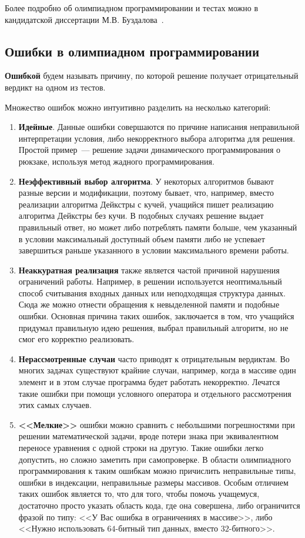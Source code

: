 Более подробно об олимпиадном программировании и тестах можно в кандидатской 
диссертации М.В. Буздалова~\cite{buzdalov-diss}.

\subsection{Ошибки в олимпиадном программировании}


\textbf{Ошибкой} будем называть причину, по которой решение получает отрицательный вердикт на одном из тестов.

Множество ошибок можно интуитивно разделить на несколько категорий:
\begin{enumerate}
    \item \textbf{Идейные}. Данные ошибки совершаются по причине написания неправильной интерпретации условия,
        либо некорректного выбора алгоритма для решения. Простой пример~--- решение задачи динамического программирования 
        о рюкзаке, используя метод жадного программирования. 
    \item \textbf{Неэффективный выбор алгоритма}. У некоторых алгоритмов бывают разные версии и модификации,
        поэтому бывает, что, например, вместо реализации алгоритма Дейкстры с кучей, учащийся пишет 
        реализацию алгоритма Дейкстры без кучи. В подобных случаях решение выдает правильный ответ, но может
        либо потреблять памяти больше, чем указанный в условии максимальный доступный объем памяти
        либо не успевает завершиться раньше указанного в условии максимального времени работы.
    \item \textbf{Неаккуратная реализация} также является частой причиной нарушения ограничений работы.
        Например, в решении используется неоптимальный способ считывания входных данных или неподходящая
        структура данных. Сюда же можно отнести обращения к невыделенной памяти и подобные ошибки.
        Основная причина таких ошибок, заключается в том, что учащийся придумал правильную идею решения, 
        выбрал правильный алгоритм, но не смог его корректно реализовать.  
    \item \textbf{Нерассмотренные случаи} часто приводят к отрицательным вердиктам. Во многих задачах существуют крайние случаи,
        например, когда в массиве один элемент и в этом случае программа будет работать некорректно. Лечатся такие ошибки при помощи
        условного оператора и отдельного рассмотрения этих самых случаев.
    \item \textbf{<<Мелкие>>} ошибки можно сравнить с небольшими погрешностями при решении математической задачи, 
        вроде потери знака при эквивалентном переносе уравнения с одной строки на другую.
        Такие ошибки легко допустить, но сложно заметить при самопроверке. В области олимпиадного программирования к таким ошибкам
        можно причислить неправильные типы, ошибки в индексации, неправильные размеры массивов. Особым отличием таких ошибок
        является то, что для того, чтобы помочь учащемуся, достаточно просто указать область кода, где она совершена, либо
        ограничится фразой по типу: <<У Вас ошибка в ограничениях в массиве>>, либо <<Нужно использовать 
        $64$-битный тип данных, вместо $32$-битного>>.   
\end{enumerate}


